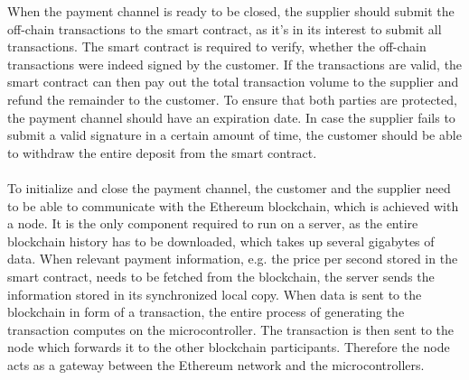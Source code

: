 When the payment channel is ready to be closed, the supplier should submit the off-chain transactions to the smart contract, as it's in its interest to submit all transactions.
The smart contract is required to verify, whether the off-chain transactions were indeed signed by the customer.
If the transactions are valid, the smart contract can then pay out the total transaction volume to the supplier and refund the remainder to the customer.
To ensure that both parties are protected, the payment channel should have an expiration date.
In case the supplier fails to submit a valid signature in a certain amount of time, the customer should be able to withdraw the entire deposit from the smart contract.
\\\\
To initialize and close the payment channel, the customer and the supplier need to be able to communicate with the Ethereum blockchain, which is achieved with a node.
It is the only component required to run on a server, as the entire blockchain history has to be downloaded, which takes up several gigabytes of data.
When relevant payment information, e.g. the price per second stored in the smart contract, needs to be fetched from the blockchain, the server sends the information stored in its synchronized local copy.
When data is sent to the blockchain in form of a transaction, the entire process of generating the transaction computes on the microcontroller.
The transaction is then sent to the node which forwards it to the other blockchain participants.
Therefore the node acts as a gateway between the Ethereum network and the microcontrollers.
\\
